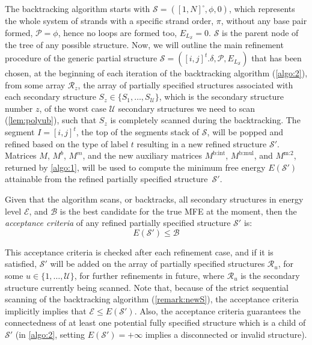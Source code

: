 \documentclass[11pt,letterpaper]{article}  \usepackage[margin=1in]{geometry}
\theoremstyle{definition}  \newtheorem{Definition}[theorem]{Definition}
\begin{document}
The backtracking algorithm  starts with $\mathcal{S} = ([1,N]^\square, \phi,0)$, which represents the whole system of strands with a specific strand order, $\pi$, without any base pair formed, $\mathcal{P} = \phi$, hence no loops are formed too, $E_{L_\mathcal{S}} = 0$. $\mathcal{S}$ is the parent node of the tree of any possible structure. 
Now, we will outline the main refinement procedure of the generic partial structure $\mathcal{S} = ([i,j]^t.\delta, \mathcal{P}, E_{L_{\mathcal{S}}})$ that has been chosen, at the beginning of each iteration of the backtracking algorithm ({\cref{algo:2}}), 
from some array $\mathcal{R}_{z}$, the array of partially specified structures associated with each secondary structure $S_{z} \in \{S_1, \ldots, S_\mathcal{U}\}$, which is the secondary structure number $z$, of the worst case $\mathcal{U}$ secondary structures we need to scan (\cref{lem:polyub}), such that $S_z$ is completely scanned during the backtracking. 
The segment $I = [i,j]^t$, the top of the
segments stack of $\mathcal{S}$, will be popped  and  refined based on the type of  label $t$ resulting in a new refined structure $\mathcal{S}'$. Matrices $M$, $M^b$, $M^m$, and the new auxiliary matrices $M^\text{b:int}$, $M^\text{b:mul}$, and $M^\text{m:2}$, returned by  \cref{algo:1}, will be used to compute the minimum free energy $E(\mathcal{S}')$ attainable from  the refined partially specified structure~$\mathcal{S}'$.



Given that the algorithm  scans, or backtracks, all secondary structures in energy level $\mathcal{E}$, and $\mathcal{B}$ is the best candidate for the true MFE at the moment, then the \emph{acceptance criteria} of any refined partially specified structure $\mathcal{S}'$ is: 
\begin{equation}
	E(\mathcal{S}') \leq    \mathcal{B}
\end{equation}

This acceptance criteria is checked after each refinement case, and if it is satisfied, $\mathcal{S}'$ will be added on the array of partially specified structures $\mathcal{R}_u$, for some $u \in \{1, \ldots, \mathcal{U} \}$, for further refinements in future, where $\mathcal{R}_u$ is the secondary structure currently being  scanned. 
Note that, because of the strict sequential scanning of the backtracking algorithm (\cref{remark:newS}), 
the acceptance criteria implicitly implies that $\mathcal{E} \leq E(\mathcal{S}')$. Also, 
the acceptance criteria guarantees the connectedness of at least one potential fully specified structure which is a child of $\mathcal{S}'$  
(in  \cref{algo:2}, setting $E(\mathcal{S}') = +\infty$ implies a disconnected or invalid structure). 
\end{document}
